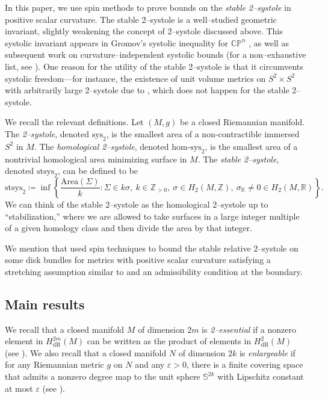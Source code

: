 \documentclass[12pt]{amsart}
\theoremstyle{definition}
\numberwithin{equation}{section}
\newcommand{\R}{\mathbb{R}}
\newcommand{\Z}{\mathbb{Z}}
\newcommand{\eps}{\varepsilon}
\newcommand{\CP}{\mathbb{C}\mathbb{P}}
\begin{document}
In this paper, we use spin methods to prove bounds on the \emph{stable 2--systole} in positive scalar curvature. The stable 2--systole is a well--studied geometric invariant, slightly weakening the concept of 2--systole discussed above. This systolic invariant appears in Gromov's systolic inequality for $\CP^n$ \cite{Gromov:sys0, Gromov:sys1, Gromov:sys2}, as well as subsequent work on curvature--independent systolic bounds (for a non--exhaustive list, see \cite{Hebda:86, Bangert-Katz:sys, GHK:systole, Hebda:sys}). One reason for the utility of the stable 2--systole is that it circumvents systolic freedom---for instance, the existence of unit volume metrics on $S^2 \times S^2$ with arbitrarily large 2--systole due to \cite{Katz-Suciu:freedom}, which does not happen for the stable 2--systole.

We recall the relevant definitions. Let $(M, g)$ be a closed Riemannian manifold. The \emph{2--systole}, denoted $\mathrm{sys}_2$, is the smallest area of a non-contractible immersed $S^2$ in $M$. The \emph{homological 2--systole}, denoted $\mathrm{hom}\text{-}\mathrm{sys}_2$, is the smallest area of a nontrivial homological area minimizing surface in $M$. The \emph{stable 2--systole}, denoted $\mathrm{stsys}_2$, can be defined to be
\begin{equation}\label{eqn:intro-stsys}
\mathrm{stsys}_2 \coloneq \inf\left\{\frac{\mathrm{Area}(\Sigma)}{k} : \Sigma \in k\sigma,\ k \in \Z_{>0},\ \sigma \in H_2(M, \Z),\ \sigma_\R \neq 0 \in H_2(M, \R)\right\}.
\end{equation}
We can think of the stable 2--systole as the homological 2--systole up to ``stabilization,'' where we are allowed to take surfaces in a large integer multiple of a given homology class and then divide the area by that integer.

We mention that \cite{Orikasa:stsys2} used spin techniques to bound the stable relative 2--systole on some disk bundles for metrics with positive scalar curvature satisfying a stretching assumption similar to \cite{Richard:s2xs2} and an admissibility condition at the boundary.


\subsection{Main results}
We recall that a closed manifold $M$ of dimension $2m$ is \emph{2--essential} if a nonzero element in $H^{2m}_{\mathrm{dR}}(M)$ can be written as the product of elements in $H^2_{\mathrm{dR}}(M)$ (see \cite{GHK:systole}). We also recall that a closed manifold $N$ of dimension $2k$ is \emph{enlargeable} if for any Riemannian metric $g$ on $N$ and any $\eps > 0$, there is a finite covering space that admits a nonzero degree map to the unit sphere $\mathbb{S}^{2k}$ with Lipschitz constant at most $\eps$ (see \cite{Gromov-Lawson:closed}).
\end{document}
